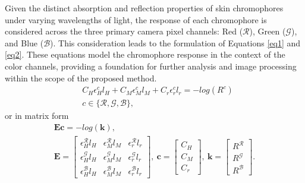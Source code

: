 \begin{spacing}{1.5}
Given the distinct absorption and reflection properties of skin chromophores under varying wavelengths of light, the response of each chromophore is considered across the three primary camera pixel channels: Red ($\mathcal{R}$), Green ($\mathcal{G}$), and Blue ($\mathcal{B}$). This consideration leads to the formulation of Equations \ref{eq1} and \ref{eq2}. These equations model the chromophore response in the context of the color channels, providing a foundation for further analysis and image processing within the scope of the proposed method.
\begin{equation}
    \begin{aligned}
         & C_H\epsilon_H^c l_H + C_M\epsilon_M^c l_M + C_r\epsilon_r^c l_r = -log(R^c) \\
         & c\in\{\mathcal{R},\mathcal{G},\mathcal{B}\},
    \end{aligned}
\end{equation}
or in matrix form
\begin{gather*}
    \mathbf{E}\mathbf{c}=-log(\mathbf{k}),\\
    \mathbf{E}=\begin{bmatrix}
        \epsilon_H^\mathcal{R} l_H & \epsilon_M^\mathcal{R} l_M & \epsilon_r^\mathcal{R} l_r \\
        \epsilon_H^\mathcal{G} l_H & \epsilon_M^\mathcal{G} l_M & \epsilon_r^\mathcal{G} l_r \\
        \epsilon_H^\mathcal{B} l_H & \epsilon_M^\mathcal{B} l_M & \epsilon_r^\mathcal{B} l_r
    \end{bmatrix},\
    \mathbf{c}=\begin{bmatrix}C_H \\C_M \\C_r\end{bmatrix},\
    \mathbf{k}=\begin{bmatrix}R^\mathcal{R} \\R^\mathcal{G} \\R^\mathcal{B}\end{bmatrix}.
\end{gather*}


\end{spacing}
